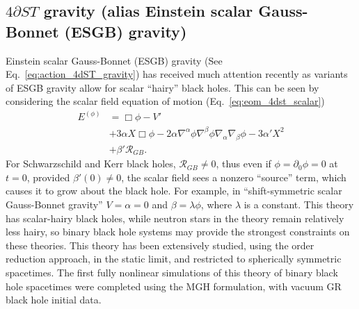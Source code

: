 \documentclass{ws-ijmpd}
\begin{document}
\subsection{$4\partial ST$ gravity (alias
Einstein scalar Gauss-Bonnet (ESGB) gravity\label{sec:esgb_numerical})}
Einstein scalar Gauss-Bonnet (ESGB) gravity
(See Eq.~\eqref{eq:action_4dST_gravity}) 
has received much attention recently as variants of
ESGB gravity allow for scalar ``hairy'' black 
holes\cite{Kanti:1995vq,Sotiriou:2013qea,Sotiriou:2014pfa}.
This can be seen by considering the scalar field equation of motion
(Eq.~\eqref{eq:eom_4dst_scalar})
\begin{align}
   \label{eq:scalar_eom_4est_again}
   E^{(\phi)}
   &=
   \Box\phi - V'
   \nonumber\\
   &+
   3\alpha X\Box\phi
   -
   2\alpha 
   \nabla^{\alpha}\phi\nabla^{\beta}\phi\nabla_{\alpha}\nabla_{\beta}\phi
   -
   3\alpha' X^2
   \nonumber\\
   &+
   \beta'\mathcal{R}_{GB}
   .
\end{align}
For Schwarzschild and Kerr black holes, $\mathcal{R}_{GB}\neq0$,
thus even if $\phi=\partial_0\phi=0$ at $t=0$, provided
$\beta'\left(0\right)\neq0$, the scalar field sees a nonzero
``source'' term, which causes it to grow about the black hole.
For example, in ``shift-symmetric scalar Gauss-Bonnet gravity''
$V=\alpha=0$ and $\beta=\lambda\phi$, where $\lambda$ is
a constant. This theory has scalar-hairy black holes,
while neutron stars in the theory remain relatively less
hairy, so binary black hole systems may provide the strongest
constraints on these theories\cite{Yagi:2015oca}.
This theory has been extensively studied,
using the order reduction approach\cite{Benkel:2016rlz,Benkel:2016kcq,
Witek:2018dmd,Okounkova:2019zep,Okounkova:2020rqw},
in the static limit\cite{Sotiriou:2014pfa,Sullivan:2020zpf}, 
and restricted to spherically
symmetric spacetimes\cite{Ripley:2019irj,Ripley:2019aqj}.
The first fully nonlinear simulations of this theory of binary
black hole spacetimes were completed using the MGH 
formulation, with vacuum GR black hole initial data\cite{East:2020hgw}.
\end{document}
